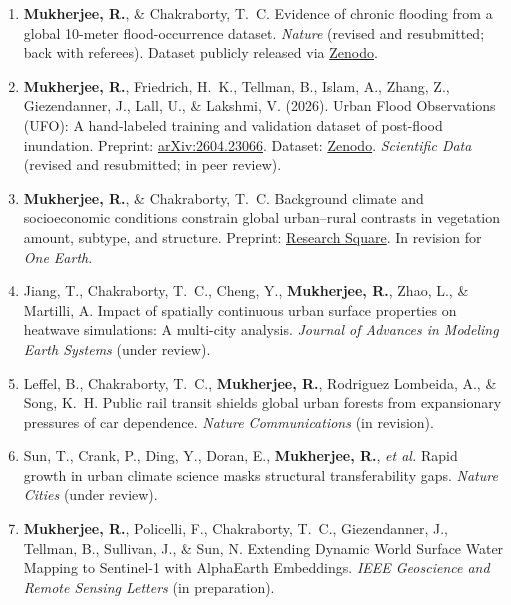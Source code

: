 \documentclass[10pt,letterpaper]{article}
\begin{document}
\small
\begin{enumerate}[leftmargin=0.2in, itemsep=0.25em, resume]
  \item \textbf{Mukherjee, R.}, \& Chakraborty, T.\ C.
  Evidence of chronic flooding from a global 10-meter flood-occurrence dataset.
  \emph{Nature} (revised and resubmitted; back with referees).
  Dataset publicly released via \href{https://zenodo.org/records/15109426}{Zenodo}.

  \item \textbf{Mukherjee, R.}, Friedrich, H.\ K., Tellman, B., Islam, A., Zhang, Z., Giezendanner, J., Lall, U., \& Lakshmi, V. (2026).
  Urban Flood Observations (UFO): A hand-labeled training and validation dataset of post-flood inundation.
  Preprint: \href{https://arxiv.org/abs/2604.23066}{arXiv:2604.23066}. Dataset: \href{https://zenodo.org/records/19698577}{Zenodo}.
  \emph{Scientific Data} (revised and resubmitted; in peer review).

  \item \textbf{Mukherjee, R.}, \& Chakraborty, T.\ C.
  Background climate and socioeconomic conditions constrain global urban--rural contrasts in vegetation amount, subtype, and structure.
  Preprint: \href{https://www.researchsquare.com/article/rs-8970245/v1}{Research Square}.
  In revision for \emph{One Earth}.

  \item Jiang, T., Chakraborty, T.\ C., Cheng, Y., \textbf{Mukherjee, R.}, Zhao, L., \& Martilli, A.
  Impact of spatially continuous urban surface properties on heatwave simulations: A multi-city analysis.
  \emph{Journal of Advances in Modeling Earth Systems} (under review).

  \item Leffel, B., Chakraborty, T.\ C., \textbf{Mukherjee, R.}, Rodriguez Lombeida, A., \& Song, K.\ H.
  Public rail transit shields global urban forests from expansionary pressures of car dependence.
  \emph{Nature Communications} (in revision).

  \item Sun, T., Crank, P., Ding, Y., Doran, E., \textbf{Mukherjee, R.}, \emph{et al.}
  Rapid growth in urban climate science masks structural transferability gaps.
  \emph{Nature Cities} (under review).

  \item \textbf{Mukherjee, R.}, Policelli, F., Chakraborty, T.\ C., Giezendanner, J., Tellman, B., Sullivan, J., \& Sun, N.
  Extending Dynamic World Surface Water Mapping to Sentinel-1 with AlphaEarth Embeddings.
  \emph{IEEE Geoscience and Remote Sensing Letters} (in preparation).


\end{enumerate}
\end{document}
